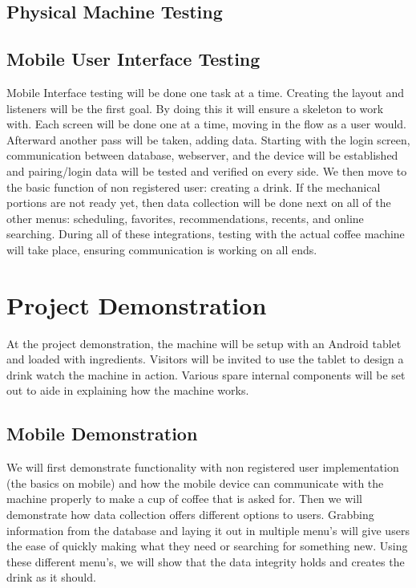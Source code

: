 \documentclass[conference]{IEEEtran}
\begin{document}
\subsection{Physical Machine Testing}

\subsection{Mobile User Interface Testing}
Mobile Interface testing will be done one task at a time. Creating the layout and listeners will be the first
 goal. By doing this it will ensure a skeleton to work with. Each screen will be done one at a time,
moving in the flow as a user would. Afterward another pass will be taken, adding data. Starting with the
 login screen, communication between database, webserver, and the device will be established and
  pairing/login data will be tested and verified on every side. We then move to the basic function of non
  registered user: creating a drink. If the mechanical portions are not ready yet, then data collection will
   be done next on all of the other menus: scheduling, favorites, recommendations, recents, and online
    searching. During all of these integrations, testing with the actual coffee machine will take place, 
    ensuring communication is working on all ends. 

\section{Project Demonstration}
At the project demonstration, the machine will be setup with an Android tablet and loaded with ingredients.
Visitors will be invited to use the tablet to design a drink watch the machine in action. Various spare internal components
will be set out to aide in explaining how the machine works.

\subsection{Mobile Demonstration}
We will first demonstrate functionality with non registered user implementation (the basics on mobile)
 and how the mobile device can communicate with the machine properly to make a cup of coffee that is
  asked for. Then we will demonstrate how data collection offers different options to users. Grabbing 
  information from the database and laying it out in multiple menu's will give users the ease of quickly 
  making what they need or searching for something new. Using these different menu's, we will show 
  that the data integrity holds and creates the drink as it should. 
 

% 
% 

{}

\end{document}
